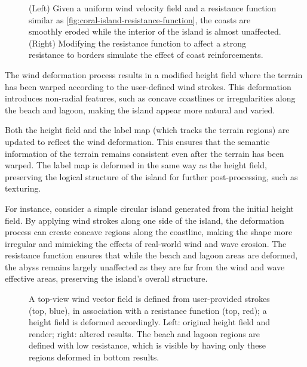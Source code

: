 \begin{figure}[H]
    \caption{(Left) Given a uniform wind velocity field and a resistance function similar as \cref{fig:coral-island-resistance-function}, the coasts are smoothly eroded while the interior of the island is almost unaffected. (Right) Modifying the resistance function to affect a strong resistance to borders simulate the effect of coast reinforcements.}
\end{figure}


The wind deformation process results in a modified height field where the terrain has been warped according to the user-defined wind strokes. This deformation introduces non-radial features, such as concave coastlines or irregularities along the beach and lagoon, making the island appear more natural and varied.

Both the height field and the label map (which tracks the terrain regions) are updated to reflect the wind deformation. This ensures that the semantic information of the terrain remains consistent even after the terrain has been warped. The label map is deformed in the same way as the height field, preserving the logical structure of the island for further post-processing, such as texturing.

For instance, consider a simple circular island generated from the initial height field. By applying wind strokes along one side of the island, the deformation process can create concave regions along the coastline, making the shape more irregular and mimicking the effects of real-world wind and wave erosion. The resistance function ensures that while the beach and lagoon areas are deformed, the abyss remains largely unaffected as they are far from the wind and wave effective areas, preserving the island's overall structure.

\begin{figure}
    \caption{A top-view wind vector field is defined from user-provided strokes (top, blue), in association with a resistance function (top, red); a height field is deformed accordingly. Left: original height field and render; right: altered results. The beach and lagoon regions are defined with low resistance, which is visible by having only these regions deformed in bottom results. }
    \label{fig:coral-island-wind-effect-result}
\end{figure}


